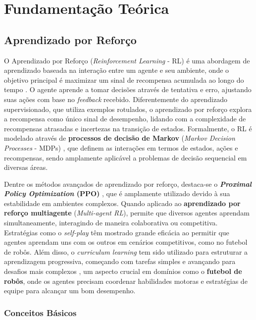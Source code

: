 \chapter{Fundamentação Teórica}
\label{cap:fund}

\section{Aprendizado por Reforço}
\label{sec:rl}

O Aprendizado por Reforço (\textit{Reinforcement Learning} - RL) é uma abordagem de aprendizado baseada na interação entre um agente e seu ambiente, onde o objetivo principal é maximizar um sinal de recompensa acumulada ao longo do tempo \cite{sutton}. O agente aprende a tomar decisões através de tentativa e erro, ajustando suas ações com base no \textit{feedback} recebido. Diferentemente do aprendizado supervisionado, que utiliza exemplos rotulados, o aprendizado por reforço explora a recompensa como único sinal de desempenho, lidando com a complexidade de recompensas atrasadas e incertezas na transição de estados. Formalmente, o RL é modelado através de \textbf{processos de decisão de Markov} (\textit{Markov Decision Processes} - MDPs) \cite{sutton}, que definem as interações em termos de estados, ações e recompensas, sendo amplamente aplicável a problemas de decisão sequencial em diversas áreas.

Dentre os métodos avançados de aprendizado por reforço, destaca-se o \textbf{\textit{Proximal Policy Optimization} (PPO)} \cite{PPO}, que é amplamente utilizado devido à sua estabilidade em ambientes complexos. Quando aplicado ao \textbf{aprendizado por reforço multiagente} (\textit{Multi-agent RL}), permite que diversos agentes aprendam simultaneamente, interagindo de maneira colaborativa ou competitiva. Estratégias como o \textit{self-play} têm mostrado grande eficácia ao permitir que agentes aprendam uns com os outros em cenários competitivos, como no futebol de robôs. Além disso, o \textit{curriculum learning} \cite{curriculum} tem sido utilizado para estruturar a aprendizagem progressiva, começando com tarefas simples e avançando para desafios mais complexos \cite{curriculum_task_sequence}, um aspecto crucial em domínios como o \textbf{futebol de robôs}, onde os agentes precisam coordenar habilidades motoras e estratégias de equipe para alcançar um bom desempenho.

\subsection{Conceitos Básicos}
\label{subsec:rl_conceitos}

